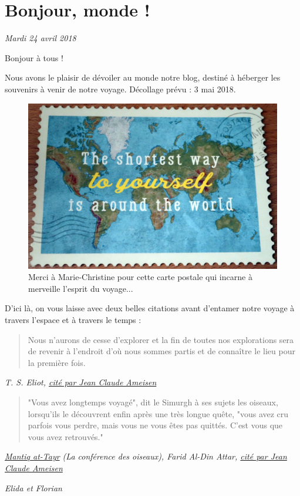 \hypertarget{bonjour-monde}{%
\section{Bonjour, monde !}\label{bonjour-monde}}

\emph{Mardi 24 avril 2018}

Bonjour à tous !

Nous avons le plaisir de dévoiler au monde notre blog, destiné à
héberger les souvenirs à venir de notre voyage. Décollage prévu : 3 mai
2018.

\begin{figure}
\centering
\includegraphics{images/world_postcard.jpg}
\caption{Merci à Marie-Christine pour cette carte postale qui incarne à
merveille l'esprit du voyage...}
\end{figure}

D'ici là, on vous laisse avec deux belles citations avant d'entamer
notre voyage à travers l'espace et à travers le temps :

\begin{quote}
Nous n'aurons de cesse d'explorer et la fin de toutes nos explorations
sera de revenir à l'endroit d'où nous sommes partis et de connaître le
lieu pour la première fois.
\end{quote}

\emph{T. S. Eliot,
\href{https://www.franceinter.fr/emissions/sur-les-epaules-de-darwin/sur-les-epaules-de-darwin-21-avril-2018}{cité
par Jean Claude Ameisen}}

\begin{quote}
"Vous avez longtemps voyagé", dit le Simurgh à ses sujets les oiseaux,
lorsqu'ils le découvrent enfin après une très longue quête, "vous avez
cru parfois vous perdre, mais vous ne vous êtes pas quittés. C'est vous
que vous avez retrouvés."
\end{quote}

\emph{\href{https://fr.wikipedia.org/wiki/La_Conférence_des_oiseaux}{Mantiq
at-Tayr} (La conférence des oiseaux), Farid Al-Din Attar,
\href{https://www.franceinter.fr/emissions/sur-les-epaules-de-darwin/sur-les-epaules-de-darwin-21-avril-2018}{cité
par Jean Claude Ameisen}}

\emph{Elida et Florian}
